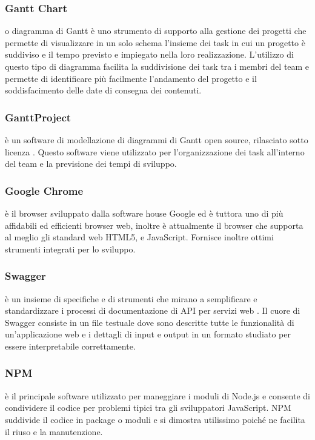 \documentclass[../NormeDiProgetto.tex]{subfiles}
\begin{document}
            \subsubsection{Gantt Chart}
             o diagramma di Gantt è uno strumento di supporto alla gestione dei progetti che permette di visualizzare in un solo schema l'insieme dei task in cui un progetto è suddiviso e il tempo previsto e impiegato nella loro realizzazione. L'utilizzo di questo tipo di diagramma facilita la suddivisione dei task tra i membri del team e permette di identificare più facilmente l'andamento del progetto e il soddisfacimento delle date di consegna dei contenuti.
            
            \subsubsection{GanttProject}
             è un software di modellazione di diagrammi di Gantt open source, rilasciato sotto licenza . Questo software viene utilizzato per l'organizzazione dei task all'interno del team e la previsione dei tempi di sviluppo.

            \subsubsection{Google Chrome}
             è il browser sviluppato dalla software house Google ed è tuttora uno di più affidabili ed efficienti browser web, inoltre è attualmente il browser che supporta al meglio gli standard web HTML5,  e JavaScript. Fornisce inoltre ottimi strumenti integrati per lo sviluppo.

            \subsubsection{Swagger}
             è un insieme di specifiche e di strumenti che mirano a semplificare e standardizzare i processi di documentazione di API per servizi web . Il cuore di Swagger consiste in un file testuale dove sono descritte tutte le funzionalità di un'applicazione web e i dettagli di input e output in un formato studiato per essere interpretabile correttamente.

            \subsubsection{NPM}
             è il principale software utilizzato per maneggiare i moduli di Node.js e consente di condividere il codice per problemi tipici tra gli sviluppatori JavaScript. NPM suddivide il codice in package o moduli e si dimostra utilissimo poiché ne facilita il riuso e la manutenzione.
\end{document}
